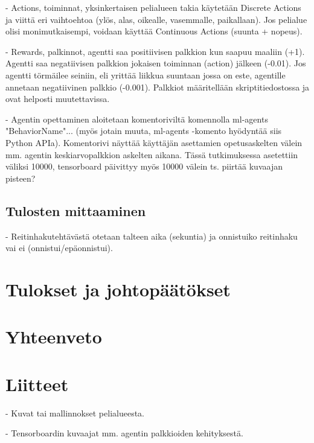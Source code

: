 \documentclass[utf8]{gradu3}
\begin{document}
- Actions, toiminnat, yksinkertaisen pelialueen takia käytetään Discrete Actions ja viittä eri vaihtoehtoa (ylös, alas, oikealle, vasemmalle, paikallaan). Jos pelialue olisi monimutkaisempi, voidaan käyttää Continuous Actions (suunta + nopeus).

- Rewards, palkinnot, agentti saa positiivisen palkkion kun saapuu maaliin (+1). Agentti saa negatiivisen palkkion jokaisen toiminnan (action) jälkeen (-0.01). Jos agentti törmäilee seiniin, eli yrittää liikkua suuntaan jossa on este, agentille annetaan negatiivinen palkkio (-0.001). Palkkiot määritellään skriptitiedostossa ja ovat helposti muutettavissa.

- Agentin opettaminen aloitetaan komentoriviltä komennolla ml-agents "BehaviorName"... (myös jotain muuta, ml-agents -komento hyödyntää siis Python APIa). Komentorivi näyttää käyttäjän asettamien opetusaskelten välein mm. agentin keskiarvopalkkion askelten aikana. Tässä tutkimuksessa asetettiin väliksi 10000, tensorboard päivittyy myös 10000 välein ts. piirtää kuvaajan pisteen?

\section{Tulosten mittaaminen}
\label{sec:mittaaminen}

- Reitinhakutehtävästä otetaan talteen aika (sekuntia) ja onnistuiko reitinhaku vai ei (onnistui/epäonnistui).

\chapter{Tulokset ja johtopäätökset}

\chapter{Yhteenveto}

\printbibliography

\chapter{Liitteet}

- Kuvat tai mallinnokset pelialueesta.

- Tensorboardin kuvaajat mm. agentin palkkioiden kehityksestä.
\end{document}
